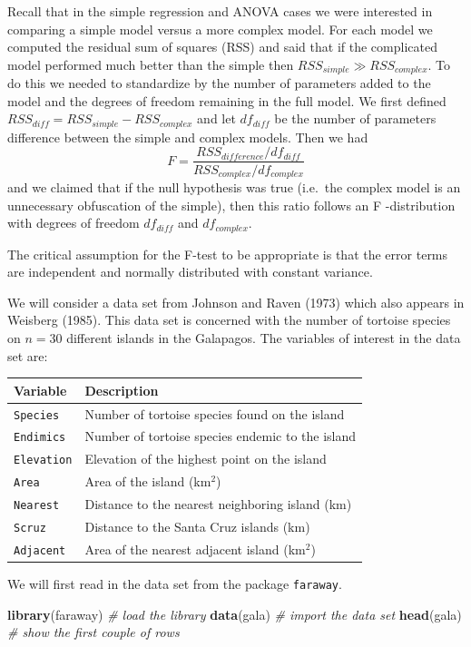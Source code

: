 \documentclass[]{book}
\newenvironment{Shaded}{\begin{snugshade}}{\end{snugshade}}
\newcommand{\KeywordTok}[1]{\textcolor[rgb]{0.13,0.29,0.53}{\textbf{{#1}}}}
\newcommand{\CommentTok}[1]{\textcolor[rgb]{0.56,0.35,0.01}{\textit{{#1}}}}
\newcommand{\NormalTok}[1]{{#1}}
\theoremstyle{definition}
\theoremstyle{definition}
\theoremstyle{remark}
\begin{document}
Recall that in the simple regression and ANOVA cases we were interested
in comparing a simple model versus a more complex model. For each model
we computed the residual sum of squares (RSS) and said that if the
complicated model performed much better than the simple then
\(RSS_{simple}\gg RSS_{complex}\). To do this we needed to standardize
by the number of parameters added to the model and the degrees of
freedom remaining in the full model. We first defined
\(RSS_{diff}=RSS_{simple}-RSS_{complex}\) and let \(df_{diff}\) be the
number of parameters difference between the simple and complex models.
Then we had
\[F=\frac{RSS_{difference}/df_{diff}}{RSS_{complex}/df_{complex}}\] and
we claimed that if the null hypothesis was true (i.e.~the complex model
is an unnecessary obfuscation of the simple), then this ratio follows an
F -distribution with degrees of freedom \(df_{diff}\) and
\(df_{complex}\).

The critical assumption for the F-test to be appropriate is that the
error terms are independent and normally distributed with constant
variance.

We will consider a data set from Johnson and Raven (1973) which also
appears in Weisberg (1985). This data set is concerned with the number
of tortoise species on \(n=30\) different islands in the Galapagos. The
variables of interest in the data set are:

\begin{longtable}[]{@{}ll@{}}
\toprule
Variable & Description\tabularnewline
\midrule
\endhead
\texttt{Species} & Number of tortoise species found on the
island\tabularnewline
\texttt{Endimics} & Number of tortoise species endemic to the
island\tabularnewline
\texttt{Elevation} & Elevation of the highest point on the
island\tabularnewline
\texttt{Area} & Area of the island (km\(^2\))\tabularnewline
\texttt{Nearest} & Distance to the nearest neighboring island
(km)\tabularnewline
\texttt{Scruz} & Distance to the Santa Cruz islands (km)\tabularnewline
\texttt{Adjacent} & Area of the nearest adjacent island
(km\(^2\))\tabularnewline
\bottomrule
\end{longtable}

We will first read in the data set from the package \texttt{faraway}.

\begin{Shaded}
\begin{Highlighting}[]
\KeywordTok{library}\NormalTok{(faraway)    }\CommentTok{# load the library }
\KeywordTok{data}\NormalTok{(gala)          }\CommentTok{# import the data set}
\KeywordTok{head}\NormalTok{(gala)          }\CommentTok{# show the first couple of rows}
\end{Highlighting}
\end{Shaded}
\end{document}
